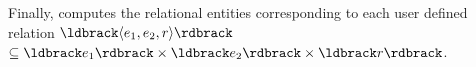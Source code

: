 %
Finally, \framework computes the relational entities corresponding to each user defined relation $\ldbrack \langle e_1,e_2,r\rangle \rdbrack$
$\subseteq \ldbrack e_1 \rdbrack \times \ldbrack e_2 \rdbrack \times \ldbrack r \rdbrack$.

